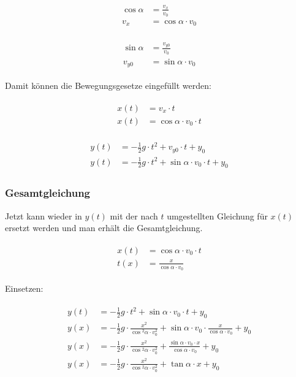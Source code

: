 \begin{align}
\begin{split}
	\cos{\alpha} &= \frac{v_x}{v_0} \\
	v_x &= \cos{\alpha} \cdot v_0
\end{split}
\end{align}

\begin{align}
\begin{split}
	\sin{\alpha} &= \frac{v_{y0}}{v_0} \\
	v_{y0} &= \sin{\alpha} \cdot v_0
\end{split}
\end{align}

\noindent Damit können die Bewegungsgesetze eingefüllt werden:

\begin{align}
\begin{split}
	x(t) &= v_x \cdot t \\
	x(t) &= \cos{\alpha} \cdot v_0 \cdot t
\end{split}
\end{align}

\begin{align}
\begin{split}
	y(t) &= -\frac{1}{2}g \cdot t^2 + v_{y0} \cdot t + y_0 \\
	y(t) &= -\frac{1}{2}g \cdot t^2 + \sin{\alpha} \cdot v_0 \cdot t + y_0
\end{split}
\end{align}


\subsubsection{Gesamtgleichung}


Jetzt kann wieder in $y(t)$ mit der nach $t$ umgestellten Gleichung für $x(t)$ ersetzt werden und man erhält die Gesamtgleichung.

\begin{align}
\begin{split}
	x(t) &= \cos{\alpha} \cdot v_0 \cdot t \\
	t(x) &= \frac{x}{\cos{\alpha} \cdot v_0}
\end{split}
\end{align}

\noindent Einsetzen:

\begin{align}
\begin{split}
	y(t) &= -\frac{1}{2}g \cdot t^2 + \sin{\alpha} \cdot v_0 \cdot t + y_0 \\
	y(x) &= -\frac{1}{2}g \cdot \frac{x^2}{\cos{^2\alpha} \cdot v_0^2} + \sin{\alpha} \cdot v_0 \cdot \frac{x}{\cos{\alpha} \cdot v_0} + y_0 \\
	y(x) &= -\frac{1}{2}g \cdot \frac{x^2}{\cos{^2\alpha} \cdot v_0^2} + \frac{\sin{\alpha} \cdot v_0 \cdot x}{\cos{\alpha} \cdot v_0} + y_0 \\
	y(x) &= -\frac{1}{2}g \cdot \frac{x^2}{\cos{^2\alpha} \cdot v_0^2} + \tan{\alpha} \cdot x + y_0 \\
\end{split}
\end{align}

